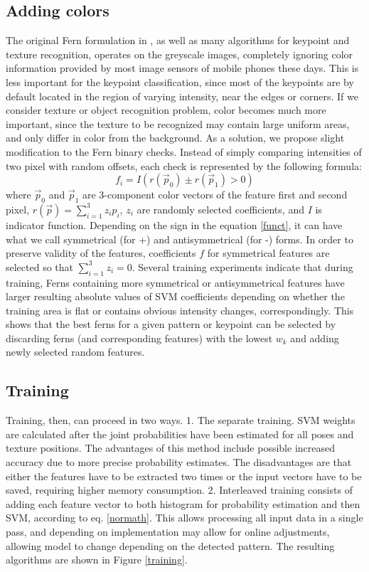 \documentclass[10pt,twocolumn, a4paper]{article}
\begin{document}
\subsection{Adding colors}
The original Fern formulation in \cite{Ferns1}, as well as many algorithms for keypoint and texture recognition, operates on the greyscale images, completely ignoring color information provided by most image sensors of mobile phones these days. This is less important for the keypoint classification, since most of the keypoints are by default located in the region of varying intensity, near the edges or corners. If we consider texture or object recognition problem, color becomes much more important, since the texture to be recognized may contain large uniform areas, and only differ in color from the background.  As a solution, we propose slight modification to the Fern binary checks. Instead of simply comparing intensities of two pixel with random offsets, each check is represented by the following formula:
\begin{equation}
\label{funct}
f_i=I(r(\vec{p}_0)\pm r(\vec{p}_1)>0)
\end{equation}
where $\vec{p}_0$ and $\vec{p}_1$ are 3-component color vectors of the feature first and second pixel, $r(\vec{p})=\sum_{i=1}^{3} {z_i p_i}$, $z_i$ are randomly selected coefficients, and $I$ is indicator function. Depending on the sign in the equation \ref{funct}, it can have what we call symmetrical (for +) and antisymmetrical (for -) forms. In order to preserve validity of the features, coefficients $f$ for symmetrical features are selected so that $\sum_{i=1}^{3} {z_i}=0$. Several training experiments indicate that during training, Ferns containing more symmetrical or antisymmetrical features have larger resulting absolute values of SVM coefficients depending on whether the training area is flat or contains obvious intensity changes, correspondingly. This shows that the best ferns for a given pattern or keypoint can be selected by discarding ferns (and corresponding features) with the lowest $w_k$ and adding newly selected random features.
\subsection{Training}
\label{train}
Training, then, can proceed in two ways. 1. The separate training. SVM weights are calculated after the joint probabilities have been estimated for all poses and texture positions. The advantages of this method include possible increased accuracy due to more precise probability estimates. The disadvantages are that either the features have to be extracted two times or the input vectors have to be saved, requiring higher memory consumption. 2. Interleaved training consists of adding each feature vector to both histogram for probability estimation and then SVM, according to eq. \ref{normath}. This allows processing all input data in a single pass, and depending on implementation may allow for online adjustments, allowing model to change depending on the detected pattern. 
The resulting algorithms are shown in Figure \ref{training}.
\end{document}
